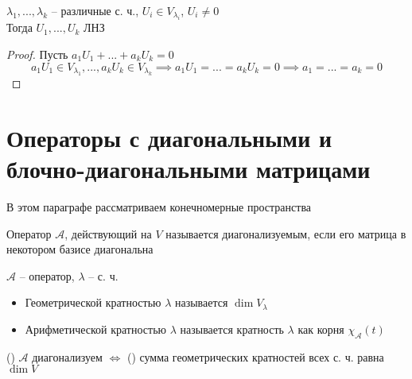 \begin{implication}
	$ \lambda_1, ..., \lambda_k $ -- различные с. ч., $ U_i \in V_{\lambda_i} $, $ U_i \ne 0 $ \\
	Тогда $ U_1, ..., U_k $ ЛНЗ
\end{implication}

\begin{proof}
	Пусть $ a_1U_1 + ... + a_kU_k = 0 $
	$$ a_1U_1 \in V_{\lambda_1}, ..., a_kU_k \in V_{\lambda_k} \implies a_1U_1 = ... = a_kU_k = 0 \implies a_1 = ... = a_k = 0 $$
\end{proof}

\section{Операторы с диагональными и блочно-диагональными матрицами}

В этом параграфе рассматриваем конечномерные пространства

\begin{definition}
	Оператор $ \mathcal{A} $, действующий на $ V $ называется диагонализуемым, если его матрица в некотором базисе диагональна
\end{definition}

\begin{definition}
	$ \mathcal{A} $ -- оператор, $ \lambda $ -- с. ч.
	\begin{itemize}
		\item Геометрической кратностью $ \lambda $ называется $ \dim V_\lambda $
		\item Арифметической кратностью $ \lambda $ называется кратность $ \lambda $ как корня $ \chi_{\mathcal{A}}(t) $
	\end{itemize}
\end{definition}

\begin{theorem}
	() $ \mathcal{A} $ диагонализуем $ \iff $ () сумма геометрических кратностей всех с. ч. равна $ \dim V $
\end{theorem}

